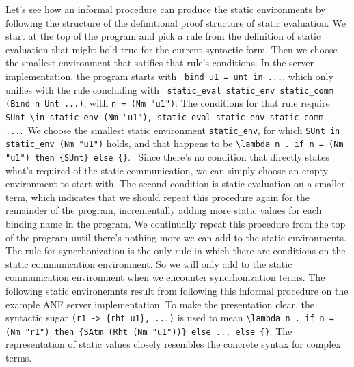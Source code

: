 \documentclass[10pt]{article}
\begin{document}
Let's see how an informal procedure can produce the static environments by following the
structure of the definitional proof structure of static evaluation.
We start at the top of the program and pick a
rule from the definition of static evaluation that might hold true for the current syntactic form.
Then we choose the smallest environment that satifies that rule's conditions. 
In the server implementation, the program starts with \
\lstinline[language=normal_lang, mathescape]{bind u1 = unt in ...}, which only unifies with 
the rule concluding with \
\lstinline[language=logic, mathescape]{static_eval static_env static_comm (Bind n Unt ...)},
with \lstinline[language=logic, mathescape]{n = (Nm "u1")}. 
The conditions for that rule require 
\lstinline[language=logic, mathescape]{SUnt \in static_env (Nm "u1"), static_eval static_env static_comm ...}.\
We choose the smallest static environment \lstinline{static_env}, for which
\lstinline[language=logic]{SUnt in static_env (Nm "u1")} holds, and that happens to be 
\lstinline[language=logic]|\lambda n . if n = (Nm "u1") then {SUnt} else {}|. \
Since there's no condition that directly states what's required of the static communication, we can
simply choose an empty environment to start with. The second condition is static evaluation on
a smaller term, which indicates that we should repeat this procedure again for the remainder of
the program, incrementally adding more static values for each binding name in the program.
We continually repeat this procedure from the top of the program until there's
nothing more we can add to the static environments.
The rule for syncrhonization is the only rule in which there are conditions on
the static communication environment. So we will only add to the static communication
environment when we encounter syncrhonization terms.
The following static environemnts result from following this informal procedure on
the example ANF server implementation.
To make the presentation clear, the syntactic sugar \lstinline|(r1 -> {rht u1}, ...)| is used 
to mean \lstinline[language=logic]|\lambda n . if n = (Nm "r1") then {SAtm (Rht (Nm "u1"))} else ... else {}|.
The representation of static values closely resembles the concrete syntax for complex terms.
\end{document}
